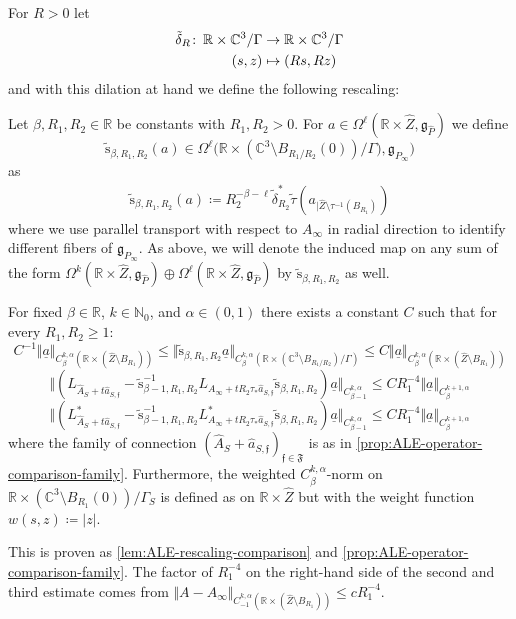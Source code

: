 \documentclass[11pt,a4paper]{scrartcl}
\newcommand{\col}{\colon \thinspace}
\newcommand{\VertWH}[3]{\Vert_{C^{{#1},\alpha}_{{#2}}{#3}}}
\numberwithin{equation}{section}
\theoremstyle{plain}
\theoremstyle{definition}
\theoremstyle{remark}
\begin{document}
\noindent For $R>0$ let 
\begin{align*}
\tilde{\delta}_R \col \mathbb{R}\times \mathbb{C}^3/\Gamma &\to \mathbb{R}\times \mathbb{C}^3/\Gamma  \\
(s,z) & \mapsto (Rs,Rz)
\end{align*}
and with this dilation at hand we define the following rescaling:
\begin{definition}\label{def:scaling_on_C^3}
Let $\beta,R_1,R_2\in \mathbb{R}$ be constants with $R_1, R_2>0$. For $a \in \Omega^{\ell}(\mathbb{R}\times \hat{Z},\mathfrak{g}_{\hat{P}})$ we define \[\tilde{\mathrm{s}}_{\beta,R_1,R_2}(a) \in \Omega^{\ell}\big(\mathbb{R}\times (\mathbb{C}^3\setminus B_{R_1/R_2}(0))/\Gamma),\mathfrak{g}_{P_\infty}\big)  \]
as 
\begin{align*}
\tilde{\mathrm{s}}_{\beta,R_1,R_2}(a) \coloneqq R_2^{-\beta-\ell} \tilde{\delta}_{R_2}^*\tilde{\tau}(a_{\vert \hat{Z}\setminus \tau^{-1}(B_{R_1})})
\end{align*}
where we use parallel transport with respect to $A_\infty$ in radial direction to identify different fibers of $\mathfrak{g}_{P_\infty}$. As above, we will denote the induced map on any sum of the form $\Omega^k(\mathbb{R}\times\hat{Z},\mathfrak{g}_{\hat{P}})\oplus \Omega^{\ell}(\mathbb{R}\times\hat{Z},\mathfrak{g}_{\hat{P}})$ by $\tilde{\mathrm{s}}_{\beta,R_1,R_2}$ as well.
\end{definition}
\begin{lemma}\label{lem:C^3-rescaling-comparison} 
For fixed $\beta\in \mathbb{R}$, $k\in \mathbb{N}_0$, and $\alpha\in(0,1)$ there exists a constant $C$ such that for every $R_1, R_2 \geq 1$: 
\[C^{-1} \Vert \underline{a} \VertWH{k}{\beta}{(\mathbb{R}\times (\hat{Z}\setminus B_{R_1}))} \leq \Vert \tilde{\mathrm{s}}_{\beta,R_1,R_2} \underline{a} \VertWH{k}{\beta}{(\mathbb{R}\times (\mathbb{C}^3\setminus B_{R_1/R_2})/\Gamma)} \leq C\Vert \underline{a} \VertWH{k}{\beta}{(\mathbb{R}\times (\hat{Z}\setminus B_{R_1}))} 
\]
\[
\Vert (L_{\hat{A}_S+t\hat{a}_{S,\mathfrak{f}}} - \tilde{\mathrm{s}}_{\beta-1,R_1,R_2}^{-1} L_{A_\infty+tR_2 \tau_*\hat{a}_{S,\mathfrak{f}}} \tilde{\mathrm{s}}_{\beta,R_1,R_2})\underline{a} \VertWH{k}{\beta-1}{}\leq C R_1^{-4} \Vert \underline{a} \VertWH{k+1}{\beta}{}
\]
\[
\Vert (L_{\hat{A}_S+t\hat{a}_{S,\mathfrak{f}}}^* - \tilde{\mathrm{s}}_{\beta-1,R_1,R_2}^{-1} L_{A_\infty+tR_2 \tau_*\hat{a}_{S,\mathfrak{f}}}^* \tilde{\mathrm{s}}_{\beta,R_1,R_2})\underline{a} \VertWH{k}{\beta-1}{}\leq C R_1^{-4} \Vert \underline{a} \VertWH{k+1}{\beta}{}
\]
where the family of connection $(\hat{A}_S+\hat{a}_{S,\mathfrak{f}})_{\mathfrak{f} \in \mathfrak{F}}$ is as in \autoref{prop:ALE-operator-comparison-family}.
Furthermore, the weighted $C^{k,\alpha}_\beta$-norm on $\mathbb{R}\times (\mathbb{C}^3\setminus B_{R_1}(0))/\Gamma_S$ is defined as on $\mathbb{R}\times \hat{Z}$ but with the weight function $w(s,z) \coloneqq \vert z \vert$. 
\end{lemma}
This is proven as \autoref{lem:ALE-rescaling-comparison} and \autoref{prop:ALE-operator-comparison-family}. The factor of $R_1^{-4}$ on the right-hand side of the second and third estimate comes from $\Vert A - A_\infty \VertWH{k}{-1}{(\mathbb{R}\times(\hat{Z}\setminus B_{R_1}))} \leq c R_1^{-4}$.
\end{document}
